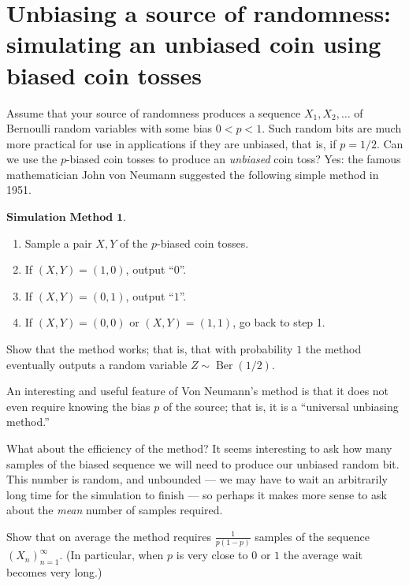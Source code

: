 \section{Unbiasing a source of randomness: simulating an unbiased coin using biased coin tosses}

Assume that your source of randomness produces a
sequence $X_1, X_2, \ldots$ of Bernoulli random
variables with some bias $0<p<1$. Such random bits
are much more practical for use in applications if
they are unbiased, that is, if $p=1/2$. Can we use
the $p$-biased coin tosses to produce an \emph{unbiased}
coin toss? Yes: the famous mathematician John von
Neumann suggested the following simple method in 1951.

$\textbf{Simulation Method 1.}$

\begin{enumerate}[label=\arabic*.]
\item Sample a pair $X,Y$ of the $p$-biased coin tosses.

\item If $(X,Y)=(1,0)$, output ``$0$''.

\item If $(X,Y)=(0,1)$, output ``$1$''.

\item If $(X,Y)=(0,0)$ or $(X,Y)=(1,1)$, go back to step 1.
\end{enumerate}

\begin{xexercise}
Show that the method works; that is, that with
probability $1$ the method eventually outputs a
random variable $Z \sim \operatorname{Ber}(1/2)$.
\end{xexercise}

\noindent An interesting and useful feature of Von Neumann's
method is that it does not even require knowing the
bias $p$ of the source; that is, it is a ``universal
unbiasing method.''

What about the efficiency of the method? It seems
interesting to ask how many samples of the biased
sequence we will need to produce our unbiased random
bit. This number is random, and unbounded --- we may
have to wait an arbitrarily long time for the
simulation to finish --- so perhaps it makes more
sense to ask about the \emph{mean} number of samples
required.

\begin{xexercise}
Show that on average the method requires
$\frac{1}{p(1-p)}$ samples of the sequence
$(X_n)_{n=1}^\infty$. (In particular, when $p$ is
very close to $0$ or $1$ the average wait becomes
very long.)
\end{xexercise}
